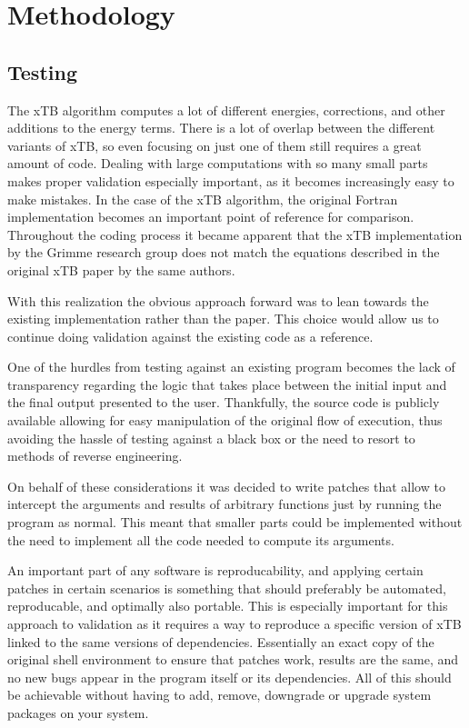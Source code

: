 \section{Methodology}

\subsection{Testing}

The xTB algorithm computes a lot of different energies, corrections, and other additions to the energy terms. There is a lot of overlap between the different variants of xTB, so even focusing on just one of them still requires a great amount of code.
Dealing with large computations with so many small parts makes proper validation especially important, as it becomes increasingly easy to make mistakes.
In the case of the xTB algorithm, the original Fortran implementation becomes an important point of reference for comparison. Throughout the coding process it became apparent that the xTB implementation by the Grimme research group does not match the equations described in the original xTB paper by the same authors.


With this realization the obvious approach forward was to lean towards the existing implementation rather than the paper. This choice would allow us to continue doing validation against the existing code as a reference.

One of the hurdles from testing against an existing program becomes the lack of transparency regarding the logic that takes place between the initial input and the final output presented to the user. Thankfully, the source code is publicly available allowing for easy manipulation of the original flow of execution, thus avoiding the hassle of testing against a black box or the need to resort to methods of reverse engineering.

On behalf of these considerations it was decided to write patches that allow to intercept the arguments and results of arbitrary functions just by running the program as normal. This meant that smaller parts could be implemented without the need to implement all the code needed to compute its arguments.

An important part of any software is reproducability, and applying certain patches in certain scenarios is something that should preferably be automated, reproducable, and optimally also portable. This is especially important for this approach to validation as it requires a way to reproduce a specific version of xTB linked to the same versions of dependencies. Essentially an exact copy of the original shell environment to ensure that patches work, results are the same, and no new bugs appear in the program itself or its dependencies. All of this should be achievable without having to add, remove, downgrade or upgrade system packages on your system.

